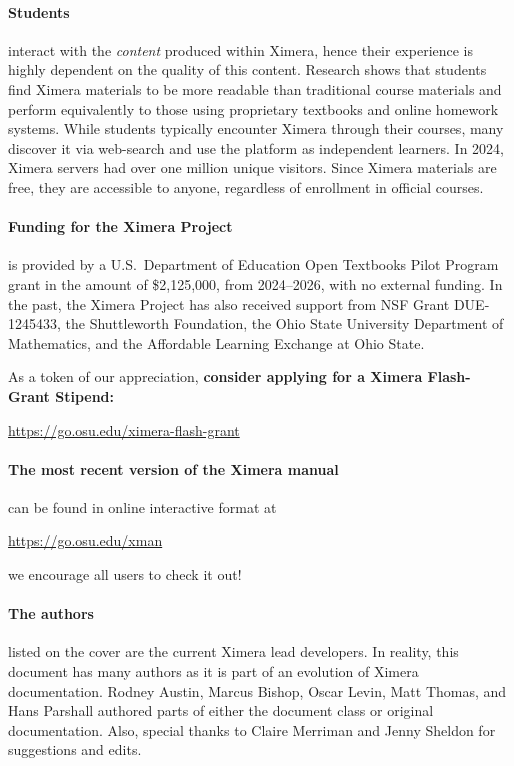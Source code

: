 \documentclass{ximera}
\begin{document}
\paragraph{Students} interact with the \textit{content} produced within
Ximera, hence their experience is highly dependent on the quality of this
content. Research shows that students find Ximera materials to be more readable
than traditional course materials and perform equivalently to those using
proprietary textbooks and online homework systems. While students typically
encounter Ximera through their courses, many discover it via web-search and
use the platform as independent learners. In 2024, Ximera servers had over one million
unique visitors. Since Ximera materials are free, they are accessible to
anyone, regardless of enrollment in official courses.



\paragraph{Funding for the Ximera Project} is provided by
a U.S.\ Department of Education Open Textbooks Pilot Program grant in the
amount of \$2,125,000, from 2024--2026, with no external funding.
In the past, the Ximera Project has
also received support from NSF Grant DUE-1245433, the Shuttleworth
Foundation, the Ohio State University
Department of Mathematics, and the Affordable Learning Exchange at Ohio State.


As a token of our appreciation, \textbf{consider applying for a Ximera
    Flash-Grant Stipend:}
\begin{center}
    \url{https://go.osu.edu/ximera-flash-grant}
\end{center}

\paragraph{The most recent version of the Ximera manual} can be found in online interactive format at
\begin{center}
\url{https://go.osu.edu/xman}
\end{center}
we encourage all users to check it out!

\paragraph{The authors} listed on the cover are the current Ximera lead
developers. In reality, this document has many authors as it is part of an
evolution of Ximera documentation. Rodney Austin, Marcus Bishop, Oscar Levin, Matt Thomas, and Hans
Parshall authored parts of either the document class or original
documentation. Also, special thanks to Claire Merriman and Jenny Sheldon for suggestions and edits.
\end{document}
